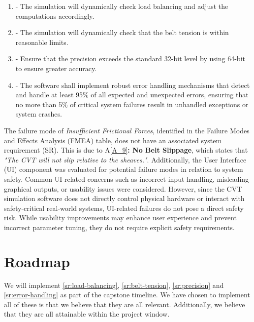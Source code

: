 \documentclass{article}
\begin{document}
\begin{enumerate}[label=\textbf{SR\arabic*},ref=SR\arabic*]
    \item  \label{sr:load-balancing}- The simulation will dynamically check load balancing and adjust the computations accordingly.
    \item  \label{sr:belt-tension}- The simulation will dynamically check that the belt tension is within reasonable limits.\\ 
    \item  \label{sr:precision}- Ensure that the precision exceeds the standard 32-bit level by using 64-bit to ensure greater accuracy. \\
    \item  \label{sr:error-handling}- The software shall implement robust error handling mechanisms that detect and handle at least 95\% of all expected and unexpected errors, ensuring that no more than 5\% of critical system failures result in unhandled exceptions or system crashes.\\
\end{enumerate}

\noindent The failure mode of \textit{Insufficient Frictional Forces}, identified in the Failure Modes and Effects Analysis (FMEA) table, does not have an associated system requirement (SR). 
This is due to A\ref{A_9}\textbf{: No Belt Slippage}, which states that \textit{"The CVT will not slip relative to the sheaves."}. 
Additionally, the User Interface (UI) component was evaluated for potential failure modes in relation to system safety. Common UI-related concerns such as incorrect input handling, misleading graphical outputs, or usability issues were considered. However, since the CVT simulation software does not directly control physical hardware or interact with safety-critical real-world systems, UI-related failures do not pose a direct safety risk.
While usability improvements may enhance user experience and prevent incorrect parameter tuning, they do not require explicit safety requirements.  

\section{Roadmap}

We will implement \ref{sr:load-balancing}, \ref{sr:belt-tension}, \ref{sr:precision} and \ref{sr:error-handling} as part of the capstone timeline.
We have chosen to implement all of these is that we believe that they are all relevant.
Additionally, we believe that they are all attainable within the project window.
\end{document}
